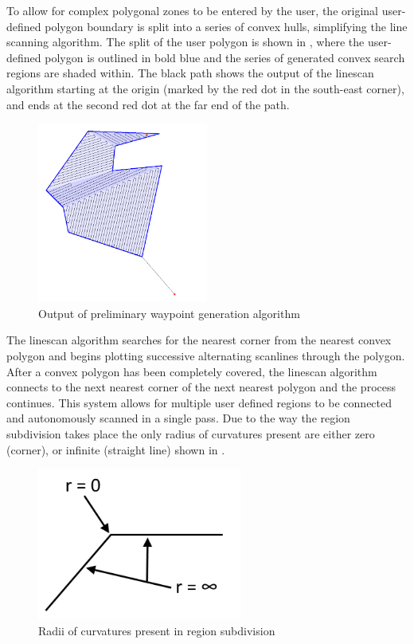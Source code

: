 \documentclass[main.tex]{subfiles}
\begin{document}
To allow for complex polygonal zones to be entered by the user, the original user-defined polygon boundary is split into a series of convex hulls, simplifying the line scanning algorithm. The split of the user polygon is shown in , where the user-defined polygon is outlined in bold blue and the series of generated convex search regions are shaded within. The black path shows the output of the linescan algorithm starting at the origin (marked by the red dot in the south-east corner), and ends at the second red dot at the far end of the path. 
\begin{figure}[ht]
\includegraphics[width=0.5\textwidth]{4-DetailedDesign/lineScanAlgorithm.png}
\centering
\caption{Output of preliminary waypoint generation algorithm} 
\end{figure}
The linescan algorithm searches for the nearest corner from the nearest convex polygon and begins plotting successive alternating scanlines through the polygon. After a convex polygon has been completely covered, the linescan algorithm connects to the next nearest corner of the next nearest polygon and the process continues. This system allows for multiple user defined regions to be connected and autonomously scanned in a single pass. Due to the way the region subdivision takes place the only radius of curvatures present are either zero (corner), or infinite (straight line) shown in .
\begin{figure}[ht]
\includegraphics[width=0.6\textwidth]{4-DetailedDesign/radiusOfCurvatures.png}
\centering
\caption{Radii of curvatures present in region subdivision} 
\end{figure}
\end{document}
